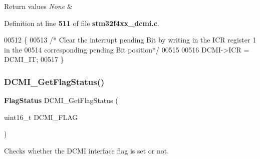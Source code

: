 \begin{DoxyRetVals}{Return values}
{\em None} & \\
\hline
\end{DoxyRetVals}


Definition at line \textbf{ 511} of file \textbf{ stm32f4xx\+\_\+dcmi.\+c}.


\begin{DoxyCode}
00512 \{
00513   \textcolor{comment}{/* Clear the interrupt pending Bit by writing in the ICR register 1 in the }
00514 \textcolor{comment}{  corresponding pending Bit position*/}
00515   
00516   DCMI->ICR = DCMI\_IT;
00517 \}
\end{DoxyCode}
\mbox{\label{group__DCMI__Group3_ga1b66e1966fbea902a8e7015c56db7587}} 
\subsubsection{D\+C\+M\+I\+\_\+\+Get\+Flag\+Status()}
{\footnotesize\ttfamily \textbf{ Flag\+Status} D\+C\+M\+I\+\_\+\+Get\+Flag\+Status (\begin{DoxyParamCaption}\item[{uint16\+\_\+t}]{D\+C\+M\+I\+\_\+\+F\+L\+AG }\end{DoxyParamCaption})}



Checks whether the D\+C\+MI interface flag is set or not. 


